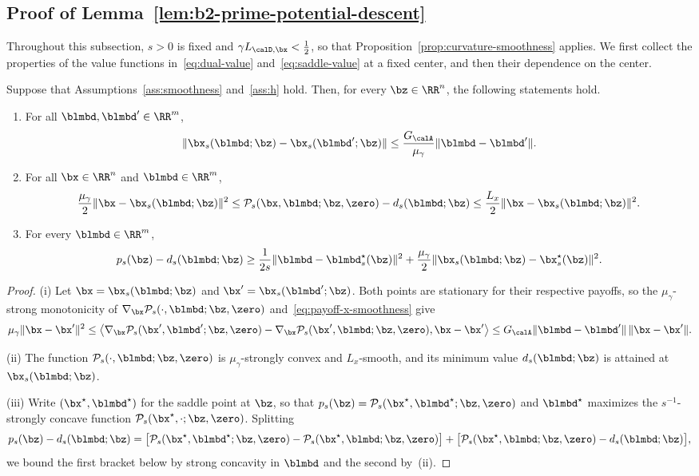 \subsection{Proof of Lemma~\ref{lem:b2-prime-potential-descent}}
\label{app:b2-prime-potential-descent}

Throughout this subsection, \(s>0\) is fixed and
\(\gamma L_{\calD,\bx}<\frac12\), so that
Proposition~\ref{prop:curvature-smoothness} applies. We first collect the
properties of the value functions in~\eqref{eq:dual-value}
and~\eqref{eq:saddle-value} at a fixed center, and then their dependence on
the center.

\begin{lemma}
\label{lem:b2-prime-fixed-center-values}
Suppose that Assumptions~\ref{ass:smoothness} and~\ref{ass:h} hold. Then, for
every \(\bz\in\RR^n\), the following statements hold.
\begin{enumerate}[label=(\roman*)]
\item For all \(\blmbd,\blmbd'\in\RR^m\),
\[
    \|\bx_s(\blmbd;\bz)-\bx_s(\blmbd';\bz)\|
    \le\frac{G_{\calA}}{\mu_\gamma}\|\blmbd-\blmbd'\| .
\]
\item For all \(\bx\in\RR^n\) and \(\blmbd\in\RR^m\),
\[
    \frac{\mu_\gamma}{2}\|\bx-\bx_s(\blmbd;\bz)\|^2
    \le\mathcal P_s(\bx,\blmbd;\bz,\zero)-d_s(\blmbd;\bz)
    \le\frac{L_x}{2}\|\bx-\bx_s(\blmbd;\bz)\|^2 .
\]
\item For every \(\blmbd\in\RR^m\),
\[
    p_s(\bz)-d_s(\blmbd;\bz)
    \ge\frac{1}{2s}\|\blmbd-\blmbd_s^\star(\bz)\|^2
    +\frac{\mu_\gamma}{2}\|\bx_s(\blmbd;\bz)-\bx_s^\star(\bz)\|^2 .
\]
\end{enumerate}
\end{lemma}

\begin{proof}
(i) Let \(\bx=\bx_s(\blmbd;\bz)\) and \(\bx'=\bx_s(\blmbd';\bz)\). Both
points are stationary for their respective payoffs, so the
\(\mu_\gamma\)-strong monotonicity of
\(\nabla_{\bx}\mathcal P_s(\cdot,\blmbd;\bz,\zero)\)
and~\eqref{eq:payoff-x-smoothness} give
\[
    \mu_\gamma\|\bx-\bx'\|^2
    \le\bigl\langle\nabla_{\bx}\mathcal P_s(\bx',\blmbd';\bz,\zero)
    -\nabla_{\bx}\mathcal P_s(\bx',\blmbd;\bz,\zero),\bx-\bx'\bigr\rangle
    \le G_{\calA}\|\blmbd-\blmbd'\|\,\|\bx-\bx'\| .
\]

(ii) The function \(\mathcal P_s(\cdot,\blmbd;\bz,\zero)\) is
\(\mu_\gamma\)-strongly convex and \(L_x\)-smooth, and its minimum value
\(d_s(\blmbd;\bz)\) is attained at \(\bx_s(\blmbd;\bz)\).

(iii) Write \((\bx^\star,\blmbd^\star)\) for the saddle point at \(\bz\), so
that \(p_s(\bz)=\mathcal P_s(\bx^\star,\blmbd^\star;\bz,\zero)\) and
\(\blmbd^\star\) maximizes the \(s^{-1}\)-strongly concave function
\(\mathcal P_s(\bx^\star,\cdot;\bz,\zero)\). Splitting
\[
    p_s(\bz)-d_s(\blmbd;\bz)
    =\bigl[\mathcal P_s(\bx^\star,\blmbd^\star;\bz,\zero)
    -\mathcal P_s(\bx^\star,\blmbd;\bz,\zero)\bigr]
    +\bigl[\mathcal P_s(\bx^\star,\blmbd;\bz,\zero)-d_s(\blmbd;\bz)\bigr],
\]
we bound the first bracket below by strong concavity in \(\blmbd\) and the
second by~(ii).
\end{proof}

